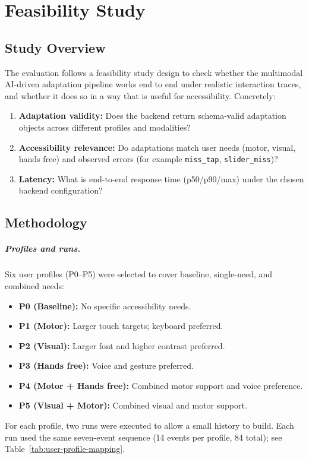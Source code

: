 \chapter{Feasibility Study}
\label{ch:evaluation}

\section{Study Overview}
The evaluation follows a feasibility study design to check whether the multimodal AI-driven adaptation pipeline works end to end under realistic interaction traces, and whether it does so in a way that is useful for accessibility. Concretely:
\begin{enumerate}
  \item \textbf{Adaptation validity:} Does the backend return schema-valid adaptation objects across different profiles and modalities?
  \item \textbf{Accessibility relevance:} Do adaptations match user needs (motor, visual, hands free) and observed errors (for example \texttt{miss\_tap}, \texttt{slider\_miss})?
  \item \textbf{Latency:} What is end-to-end response time (p50/p90/max) under the chosen backend configuration?
\end{enumerate}

\section{Methodology}
\paragraph{Profiles and runs.}
Six user profiles (P0--P5) were selected to cover baseline, single-need, and combined needs:
\begin{itemize}
  \item \textbf{P0 (Baseline):} No specific accessibility needs.
  \item \textbf{P1 (Motor):} Larger touch targets; keyboard preferred.
  \item \textbf{P2 (Visual):} Larger font and higher contrast preferred.
  \item \textbf{P3 (Hands free):} Voice and gesture preferred.
  \item \textbf{P4 (Motor + Hands free):} Combined motor support and voice preference.
  \item \textbf{P5 (Visual + Motor):} Combined visual and motor support.
\end{itemize}
For each profile, two runs were executed to allow a small history to build. Each run used the same seven-event sequence (14 events per profile, 84 total); see Table~\ref{tab:user-profile-mapping}.

